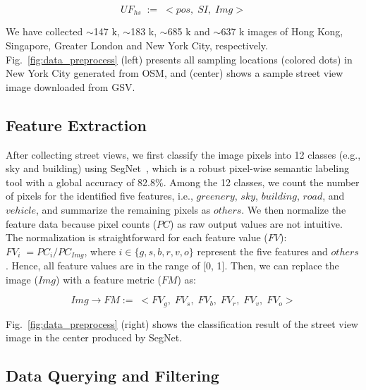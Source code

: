 \vspace*{-2mm}
\begin{equation}
\label{eq_sv}
UF_{hs} \; := \; <pos, \; SI, \; Img>
\end{equation}

We have collected $\sim$147 k, $\sim$183 k, $\sim$685 k and $\sim$637 k images of Hong Kong, Singapore, Greater London and New York City, respectively.
Fig.~\ref{fig:data_preprocess} (left) presents all sampling locations (colored dots) in New York City generated from OSM, and (center) shows a sample street view image downloaded from GSV.

\subsection{Feature Extraction}
\label{ssec:feature}
After collecting street views, we first classify the image pixels into 12 classes (e.g., sky and building) using SegNet~\cite{Badrinarayanan_2015_segnet}, which is a robust pixel-wise semantic labeling tool with a global accuracy of 82.8\%.
Among the 12 classes, we count the number of pixels for the identified five features, i.e., $greenery$, $sky$, $building$, $road$, and $vehicle$, and summarize the remaining pixels as $others$.
We then normalize the feature data because pixel counts ($PC$) as raw output values are not intuitive.
The normalization is straightforward for each feature value ($FV$):
$ FV_i \; = {PC_i} / {PC_{Img}} $, where $i \in \{g, s, b, r, v, o\}$ represent the five features and $others$.
Hence, all feature values are in the range of [0, 1].
Then, we can replace the image ($Img$) with a feature metric ($FM$) as:

\vspace*{-2mm}
\begin{equation}
\label{eq_fm}
Img \rightarrow FM := \; <FV_g, \; FV_s, \; FV_b, \; FV_r, \; FV_v, \; FV_o>
\end{equation}

Fig.~\ref{fig:data_preprocess} (right) shows the classification result of the street view image in the center produced by SegNet.

\subsection{Data Querying and Filtering}
\label{ssec:query}

